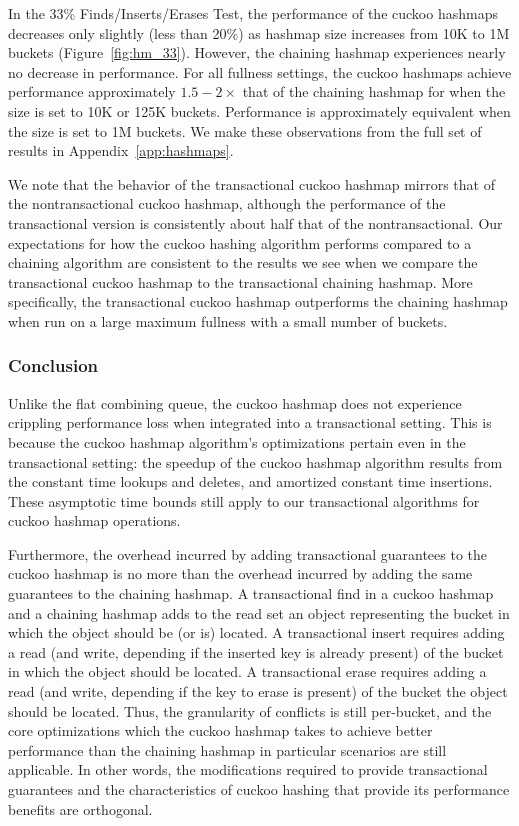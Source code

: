 In the 33\% Finds/Inserts/Erases Test, the performance of the cuckoo hashmaps decreases only slightly (less than 20\%) as hashmap size increases from 10K to 1M buckets (Figure~\ref{fig:hm_33}). However, the chaining hashmap experiences nearly no decrease in performance. For all fullness settings, the cuckoo hashmaps achieve performance approximately $1.5-2\times$ that of the chaining hashmap for when the size is set to 10K or 125K buckets. Performance is approximately equivalent when the size is set to 1M buckets. We make these observations from the full set of results in Appendix~\ref{app:hashmaps}.

We note that the behavior of the transactional cuckoo hashmap mirrors that of the nontransactional cuckoo hashmap, although the performance of the transactional version is consistently about half that of the nontransactional. Our expectations for how the cuckoo hashing algorithm performs compared to a chaining algorithm are consistent to the results we see when we compare the transactional cuckoo hashmap to the transactional chaining hashmap.
More specifically, the transactional cuckoo hashmap outperforms the chaining hashmap when run on a large maximum fullness with a small number of buckets. 

\subsubsection{Conclusion}

Unlike the flat combining queue, the cuckoo hashmap does not experience crippling performance loss when integrated into a transactional setting. This is because the cuckoo hashmap algorithm's optimizations pertain even in the transactional setting: the speedup of the cuckoo hashmap algorithm results from the constant time lookups and deletes, and amortized constant time insertions. These asymptotic time bounds still apply to our transactional algorithms for cuckoo hashmap operations.

Furthermore, the overhead incurred by adding transactional guarantees to the cuckoo hashmap is no more than the overhead incurred by adding the same guarantees to the chaining hashmap. A transactional find in a cuckoo hashmap and a chaining hashmap adds to the read set an object representing the bucket in which the object should be (or is) located.  A transactional insert requires adding a read (and write, depending if the inserted key is already present) of the bucket in which the object should be located. A transactional erase requires adding a read (and write, depending if the key to erase is present) of the bucket the object should be located. Thus, the granularity of conflicts is still per-bucket, and the core optimizations which the cuckoo hashmap takes to achieve better performance than the chaining hashmap in particular scenarios are still applicable. In other words, the modifications required to provide transactional guarantees and the characteristics of cuckoo hashing that provide its performance benefits are orthogonal.

